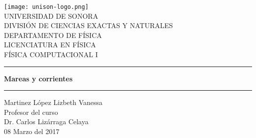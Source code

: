 \documentclass[12pt]{article}
\begin{document}
\begin{center}
\texttt{[image: unison-logo.png]}
\\
\vspace{0.5cm}
UNIVERSIDAD DE SONORA \\
\vspace{0.5cm}
DIVISIÓN DE CIENCIAS EXACTAS Y NATURALES \\
\vspace{0.5cm}
DEPARTAMENTO DE FÍSICA\\
\vspace{0.5cm}
LICENCIATURA EN FÍSICA\\
\vspace{0.5cm}
FÍSICA COMPUTACIONAL I

\vspace{2 cm}
\hrule
\vspace{1 cm}

{\huge \bfseries {Mareas y corrientes}}

\vspace{1 cm}
\hrule
\vspace{2 cm}
Martinez López Lizbeth Vanessa \\ 
\vspace{1 cm}
Profesor del curso\\
Dr. Carlos Lizárraga Celaya\\
\vspace{2 cm}
08 Marzo del 2017
\end{center}
\pagebreak
\end{document}
